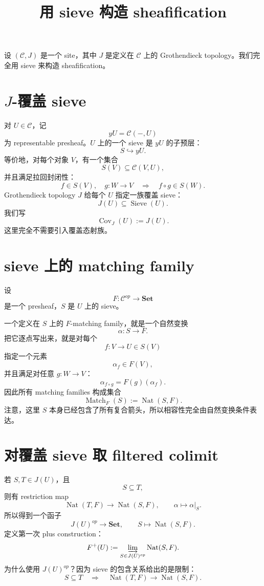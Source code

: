 \documentclass[12pt,a4paper]{article}
\title{用 sieve 构造 sheafification}
\author{}
\date{}
\begin{document}
\maketitle

设 \((\mathcal{C},J)\) 是一个 site，其中 \(J\) 是定义在 \(\mathcal{C}\) 上的 Grothendieck topology。我们完全用 sieve 来构造 sheafification。

\section{\(J\)-覆盖 sieve}

对 \(U\in\mathcal{C}\)，记
\[
yU=\mathcal{C}(-,U)
\]
为 representable presheaf。\(U\) 上的一个 sieve 是 \(yU\) 的子预层：
\[
S\hookrightarrow yU.
\]
等价地，对每个对象 \(V\)，有一个集合
\[
S(V)\subseteq \mathcal{C}(V,U),
\]
并且满足拉回封闭性：
\[
f\in S(V),\quad g:W\to V
\quad\Longrightarrow\quad
f\circ g\in S(W).
\]
Grothendieck topology \(J\) 给每个 \(U\) 指定一族覆盖 sieve：
\[
J(U)\subseteq \operatorname{Sieve}(U).
\]
我们写
\[
\operatorname{Cov}_J(U):=J(U).
\]
这里完全不需要引入覆盖态射族。

\section{sieve 上的 matching family}

设
\[
F:\mathcal{C}^{op}\to\mathbf{Set}
\]
是一个 presheaf，\(S\) 是 \(U\) 上的 sieve。

一个定义在 \(S\) 上的 \(F\)-matching family，就是一个自然变换
\[
\alpha:S\to F.
\]
把它逐点写出来，就是对每个
\[
f:V\to U\in S(V)
\]
指定一个元素
\[
\alpha_f\in F(V),
\]
并且满足对任意 \(g:W\to V\)：
\[
\alpha_{f\circ g}=F(g)(\alpha_f).
\]
因此所有 matching families 构成集合
\[
\operatorname{Match}_F(S)
:=
\operatorname{Nat}(S,F).
\]
注意，这里 \(S\) 本身已经包含了所有复合箭头，所以相容性完全由自然变换条件表达。

\section{对覆盖 sieve 取 filtered colimit}

若 \(S,T\in J(U)\)，且
\[
S\subseteq T,
\]
则有 restriction map
\[
\operatorname{Nat}(T,F)
\longrightarrow
\operatorname{Nat}(S,F),
\qquad
\alpha\longmapsto\alpha|_S.
\]
所以得到一个函子
\[
J(U)^{op}\longrightarrow\mathbf{Set},
\qquad
S\longmapsto\operatorname{Nat}(S,F).
\]
定义第一次 plus construction：
\[
F^+(U)
:=
\varinjlim_{S\in J(U)^{op}}
\operatorname{Nat}(S,F).
\]
为什么使用 \(J(U)^{op}\)？因为 sieve 的包含关系给出的是限制：
\[
S\subseteq T
\quad\Rightarrow\quad
\operatorname{Nat}(T,F)\to\operatorname{Nat}(S,F).
\]
\end{document}

